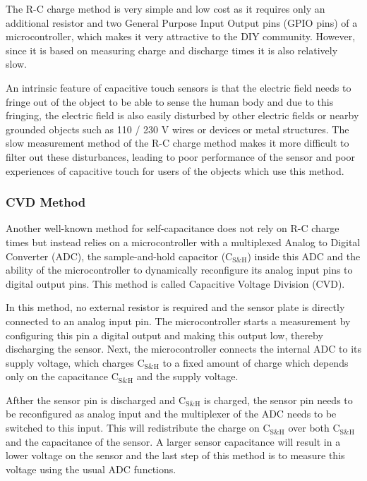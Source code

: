 \documentclass{sigchi}
\begin{document}
The R-C charge method is very simple and low cost as it requires only an
additional resistor and two General Purpose Input Output pins (GPIO pins) of a
microcontroller, which makes it very attractive to the DIY community.  However,
since it is based on measuring charge and discharge times it is also relatively
slow.

An intrinsic feature of capacitive touch sensors is that the
electric field needs to fringe out of the object to be able to sense the human
body and due to this fringing, the electric field is also easily disturbed by
other electric fields or nearby grounded objects such as 110 / 230 V wires or
devices or metal structures. The slow measurement method of the R-C charge
method makes it more difficult to filter out these disturbances, leading to poor
performance of the sensor and poor experiences of capacitive touch for users of
the objects which use this method.

\subsubsection{CVD Method}
Another well-known method for self-capacitance does not rely on R-C charge times
but instead relies on a microcontroller with a multiplexed Analog to Digital
Converter (ADC), the sample-and-hold capacitor ($\textrm{C}_{\textrm{S\&H}}$)
inside this ADC and the ability of the microcontroller to dynamically
reconfigure its analog input pins to digital output pins. This method is called
Capacitive Voltage Division (CVD).

In this method, no external resistor is required and the sensor plate is
directly connected to an analog input pin. The microcontroller starts a
measurement by configuring this pin a digital output and making this output low,
thereby discharging the sensor. Next, the microcontroller connects the internal
ADC to its supply voltage, which charges $\textrm{C}_{\textrm{S\&H}}$ to a fixed
amount of charge which depends only on the capacitance
$\textrm{C}_{\textrm{S\&H}}$ and the supply voltage.

Afther the sensor pin is discharged and $\textrm{C}_{\textrm{S\&H}}$ is
charged, the sensor pin needs to be reconfigured as analog input and the
multiplexer of the ADC needs to be switched to this input. This will
redistribute the charge on $\textrm{C}_{\textrm{S\&H}}$ over both
$\textrm{C}_{\textrm{S\&H}}$ and the capacitance of the sensor. A larger sensor
capacitance will result in a lower voltage on the sensor and the last step of
this method is to measure this voltage using the usual ADC functions.
\end{document}
